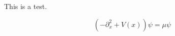 \documentclass[11pt]{report}
\begin{document}
This is a test.

\[
(-\partial_x^2 + V(x) ) \psi = \mu \psi
\]
\end{document}
